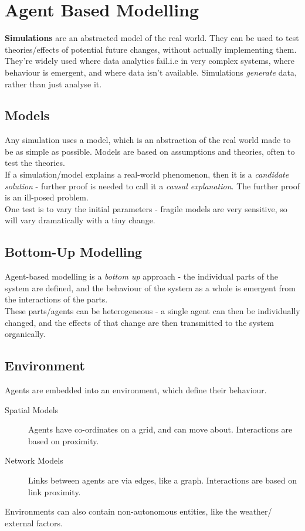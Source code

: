 \section{Agent Based Modelling}
\textbf{Simulations} are an abstracted model of the real world. They can be used to test theories/effects of potential future changes, without actually implementing them. \\

They're widely used where data analytics fail.i.e in very complex systems, where behaviour is emergent, and where data isn't available. Simulations \emph{generate} data, rather than just analyse it.\\

\subsection{Models}
Any simulation uses a model, which is an abstraction of the real world made to be as simple as possible. Models are based on assumptions and theories, often to test the theories. \\

If a simulation/model explains a real-world phenomenon, then it is a \emph{candidate solution} - further proof is needed to call it a \emph{causal explanation}. The further proof is an ill-posed problem.\\

One test is to vary the initial parameters - fragile models are very sensitive, so will vary dramatically with a tiny change. 

\subsection{Bottom-Up Modelling}
Agent-based modelling is a \emph{bottom up} approach - the individual parts of the system are defined, and the behaviour of the system as a whole is emergent from the interactions of the parts. \\

These parts/agents can be heterogeneous - a single agent can then be individually changed, and the effects of that change are then transmitted to the system organically.

\subsection{Environment}
Agents are embedded into an environment, which define their behaviour.
\begin{description}
    \item [Spatial Models] Agents have co-ordinates on a grid, and can move about. Interactions are based on proximity.
    \item [Network Models] Links between agents are via edges, like a graph. Interactions are based on link proximity.
\end{description}
Environments can also contain non-autonomous entities, like the weather/ external factors.

